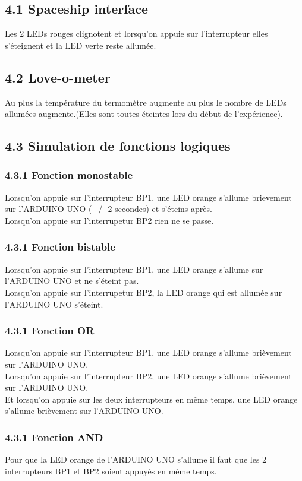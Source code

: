 \documentclass{report}
\begin{document}
\subsection*{4.1 Spaceship interface}
Les 2 LEDs rouges clignotent et lorsqu'on appuie sur l'interrupteur elles s'éteignent et la LED verte reste allumée.

\subsection*{4.2 Love-o-meter}
Au plus la température du termomètre augmente au plus le nombre de LEDs allumées augmente.(Elles sont toutes éteintes lors du début de l'expérience).

\subsection*{4.3 Simulation de fonctions logiques}

\subsubsection*{4.3.1 Fonction monostable}
Lorsqu'on appuie sur l'interrupteur BP1, une LED orange s'allume brievement sur l'ARDUINO UNO (+/- 2 secondes) et s'éteins après. \\ Lorsqu'on appuie sur l'interrupetur BP2 rien ne se passe.

\subsubsection*{4.3.1 Fonction bistable}
Lorsqu'on appuie sur l'interrupteur BP1, une LED orange s'allume sur l'ARDUINO UNO et ne s'éteint pas. \\ Lorsqu'on appuie sur l'interrupetur BP2, la LED orange qui est allumée sur l'ARDUINO UNO s'éteint.

\subsubsection*{4.3.1 Fonction OR}
Lorsqu'on appuie sur l'interrupteur BP1, une LED orange s'allume brièvement sur l'ARDUINO UNO. \\ Lorsqu'on appuie sur l'interrupteur BP2, une LED orange s'allume brièvement sur l'ARDUINO UNO.\\ Et lorsqu'on appuie sur les deux interrupteurs en même temps, une LED orange s'allume brièvement sur l'ARDUINO UNO.

\subsubsection*{4.3.1 Fonction AND}
Pour que la LED orange de l'ARDUINO UNO s'allume il faut que les 2 interrupteurs BP1 et BP2 soient appuyés en même temps.
\end{document}
